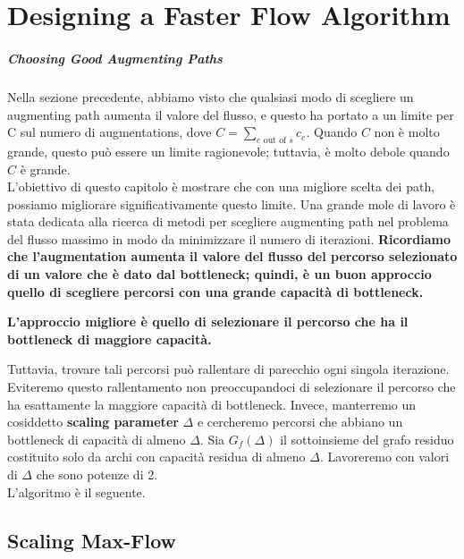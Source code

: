 \chapter{Designing a Faster Flow Algorithm}

\paragraph{Choosing Good Augmenting Paths}
Nella sezione precedente, abbiamo visto che qualsiasi modo di scegliere
un augmenting path aumenta il valore del flusso, e questo ha portato a
un limite per C sul numero di augmentations, dove
$C = \sum_{e \text{ out of }s} c_e$. Quando $C$ non è molto grande,
questo può essere un limite ragionevole; tuttavia, è molto debole quando
$C$ è grande.\\

L'obiettivo di questo capitolo è mostrare che con una migliore scelta dei
path, possiamo migliorare significativamente questo limite. Una grande
mole di lavoro è stata dedicata alla ricerca di metodi per scegliere
augmenting path nel problema del flusso massimo in modo da minimizzare
il numero di iterazioni. \textbf{Ricordiamo che l'augmentation aumenta
il valore del flusso del percorso selezionato di un valore che è dato
dal bottleneck; quindi, è un buon approccio quello di scegliere percorsi
con una grande capacità di bottleneck.}

\begin{myblockquote}
\textbf{L'approccio migliore è quello di selezionare il percorso che ha
il bottleneck di maggiore capacità.}
\end{myblockquote}

Tuttavia, trovare tali percorsi può rallentare di parecchio ogni singola
iterazione. Eviteremo questo rallentamento non preoccupandoci di
selezionare il percorso che ha esattamente la maggiore capacità di
bottleneck. Invece, manterremo un cosiddetto \textbf{scaling parameter}
$\Delta$ e cercheremo percorsi che abbiano un bottleneck di capacità
di almeno $\Delta$. Sia $G_f(\Delta)$ il sottoinsieme del grafo
residuo costituito solo da archi con capacità residua di almeno
$\Delta$. Lavoreremo con valori di $\Delta$ che sono potenze di 2.\\

L'algoritmo è il seguente.

\section{Scaling Max-Flow}


